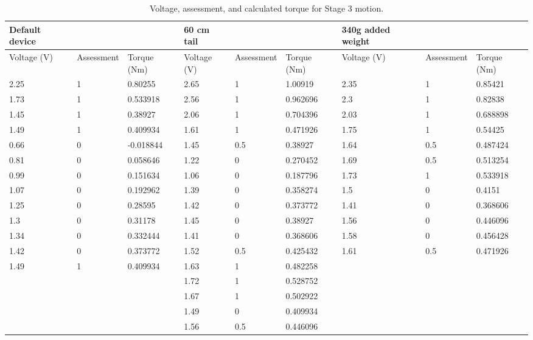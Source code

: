 \begin{landscape}
\begin{table}[!ht]
	\centering
	\caption{Voltage, assessment, and calculated torque for Stage 3 motion.}
	\footnotesize
	\begin{tabular}{|l|l|l|l|l|l|l|l|l|}
		\hline
		Default device & ~ & ~ & 60 cm tail & ~ & ~ & 340g added weight & ~ & ~ \\ \hline
		Voltage (V) & Assessment & Torque (Nm) & Voltage (V) & Assessment & Torque (Nm) & Voltage (V) & Assessment & Torque (Nm) \\ \hline
		2.25 & 1 & 0.80255 & 2.65 & 1 & 1.00919 & 2.35 & 1 & 0.85421 \\ \hline
		1.73 & 1 & 0.533918 & 2.56 & 1 & 0.962696 & 2.3 & 1 & 0.82838 \\ \hline
		1.45 & 1 & 0.38927 & 2.06 & 1 & 0.704396 & 2.03 & 1 & 0.688898 \\ \hline
		1.49 & 1 & 0.409934 & 1.61 & 1 & 0.471926 & 1.75 & 1 & 0.54425 \\ \hline
		0.66 & 0 & -0.018844 & 1.45 & 0.5 & 0.38927 & 1.64 & 0.5 & 0.487424 \\ \hline
		0.81 & 0 & 0.058646 & 1.22 & 0 & 0.270452 & 1.69 & 0.5 & 0.513254 \\ \hline
		0.99 & 0 & 0.151634 & 1.06 & 0 & 0.187796 & 1.73 & 1 & 0.533918 \\ \hline
		1.07 & 0 & 0.192962 & 1.39 & 0 & 0.358274 & 1.5 & 0 & 0.4151 \\ \hline
		1.25 & 0 & 0.28595 & 1.42 & 0 & 0.373772 & 1.41 & 0 & 0.368606 \\ \hline
		1.3 & 0 & 0.31178 & 1.45 & 0 & 0.38927 & 1.56 & 0 & 0.446096 \\ \hline
		1.34 & 0 & 0.332444 & 1.41 & 0 & 0.368606 & 1.58 & 0 & 0.456428 \\ \hline
		1.42 & 0 & 0.373772 & 1.52 & 0.5 & 0.425432 & 1.61 & 0.5 & 0.471926 \\ \hline
		1.49 & 1 & 0.409934 & 1.63 & 1 & 0.482258 & ~ & ~ & ~ \\ \hline
		~ & ~ & ~ & 1.72 & 1 & 0.528752 & ~ & ~ & ~ \\ \hline
		~ & ~ & ~ & 1.67 & 1 & 0.502922 & ~ & ~ & ~ \\ \hline
		~ & ~ & ~ & 1.49 & 0 & 0.409934 & ~ & ~ & ~ \\ \hline
		~ & ~ & ~ & 1.56 & 0.5 & 0.446096 & ~ & ~ & ~ \\ \hline
	\end{tabular}
\end{table}


\end{landscape}
